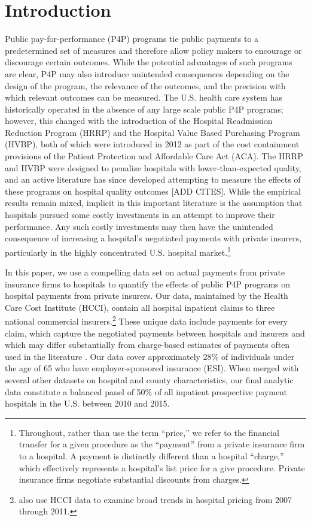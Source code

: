 \documentclass[12pt]{article}
\begin{document}
\section{Introduction}
\onehalfspacing
Public pay-for-performance (P4P) programs tie public payments to a predetermined set of measures and therefore allow policy makers to encourage or discourage certain outcomes. While the potential advantages of such programs are clear, P4P may also introduce unintended consequences depending on the design of the program, the relevance of the outcomes, and the precision with which relevant outcomes can be measured. The U.S. health care system has historically operated in the absence of any large scale public P4P programs; however, this changed with the introduction of the Hospital Readmission Reduction Program (HRRP) and the Hospital Value Based Purchasing Program (HVBP), both of which were introduced in 2012 as part of the cost containment provisions of the Patient Protection and Affordable Care Act (ACA). The HRRP and HVBP were designed to penalize hospitals with lower-than-expected quality, and an active literature has since developed attempting to measure the effects of these programs on hospital quality outcomes [ADD CITES]. While the empirical results remain mixed, implicit in this important literature is the assumption that hospitals pursued some costly investments in an attempt to improve their performance. Any such costly investments may then have the unintended consequence of increasing a hospital's negotiated payments with private insurers, particularly in the highly concentrated U.S. hospital market.\footnote{Throughout, rather than use the term ``price,'' we refer to the financial transfer for a given procedure as the ``payment'' from a private insurance firm to a hospital. A payment is distinctly different than a hospital ``charge,'' which effectively represents a hospital's list price for a give procedure. Private insurance firms negotiate substantial discounts from charges.}

In this paper, we use a compelling data set on actual payments from private insurance firms to hospitals to quantify the effects of public P4P programs on hospital payments from private insurers. Our data, maintained by the Health Care Cost Institute (HCCI), contain all hospital inpatient claims to three national commercial insurers.\footnote{\cite{cooper2017} also use HCCI data to examine broad trends in hospital pricing from 2007 through 2011.}  These unique data include payments for every claim, which capture the negotiated payments between hospitals and insurers and which may differ substantially from charge-based estimates of payments often used in the literature \citep{dafny2009,dranove2017}. Our data cover approximately 28$\%$ of individuals under the age of 65 who have employer-sponsored insurance (ESI). When merged with several other datasets on hospital and county characteristics, our final analytic data constitute a balanced panel of 50$\%$ of all inpatient prospective payment hospitals in the U.S. between 2010 and 2015.
\end{document}
